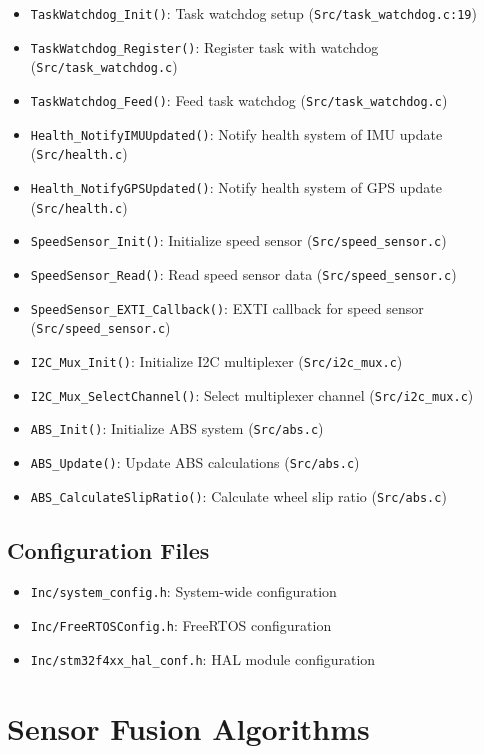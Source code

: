 \documentclass[11pt,a4paper]{article}
\begin{document}
\begin{itemize}
    \item \texttt{TaskWatchdog\_Init()}: Task watchdog setup (\texttt{Src/task\_watchdog.c:19})
    \item \texttt{TaskWatchdog\_Register()}: Register task with watchdog (\texttt{Src/task\_watchdog.c})
    \item \texttt{TaskWatchdog\_Feed()}: Feed task watchdog (\texttt{Src/task\_watchdog.c})
    \item \texttt{Health\_NotifyIMUUpdated()}: Notify health system of IMU update (\texttt{Src/health.c})
    \item \texttt{Health\_NotifyGPSUpdated()}: Notify health system of GPS update (\texttt{Src/health.c})
    \item \texttt{SpeedSensor\_Init()}: Initialize speed sensor (\texttt{Src/speed\_sensor.c})
    \item \texttt{SpeedSensor\_Read()}: Read speed sensor data (\texttt{Src/speed\_sensor.c})
    \item \texttt{SpeedSensor\_EXTI\_Callback()}: EXTI callback for speed sensor (\texttt{Src/speed\_sensor.c})
    \item \texttt{I2C\_Mux\_Init()}: Initialize I2C multiplexer (\texttt{Src/i2c\_mux.c})
    \item \texttt{I2C\_Mux\_SelectChannel()}: Select multiplexer channel (\texttt{Src/i2c\_mux.c})
    \item \texttt{ABS\_Init()}: Initialize ABS system (\texttt{Src/abs.c})
    \item \texttt{ABS\_Update()}: Update ABS calculations (\texttt{Src/abs.c})
    \item \texttt{ABS\_CalculateSlipRatio()}: Calculate wheel slip ratio (\texttt{Src/abs.c})
\end{itemize}

\subsection{Configuration Files}
\begin{itemize}
    \item \texttt{Inc/system\_config.h}: System-wide configuration
    \item \texttt{Inc/FreeRTOSConfig.h}: FreeRTOS configuration
    \item \texttt{Inc/stm32f4xx\_hal\_conf.h}: HAL module configuration
\end{itemize}

\section{Sensor Fusion Algorithms}
\end{document}
